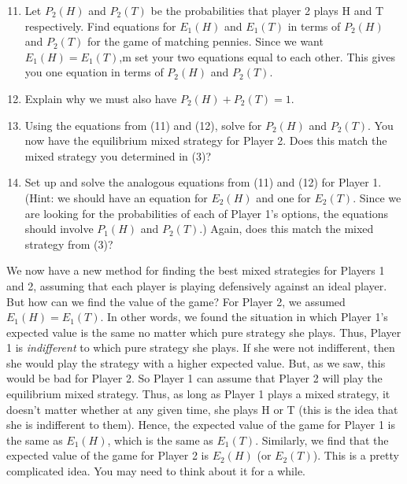 \begin{enumerate}
\setcounter{enumi}{10}

\item Let $P_2(H)$ and $P_2(T)$ be the probabilities that player 2 plays H and T respectively. Find equations for $E_1(H)$ and $E_1(T)$ in terms of $P_2(H)$ and $P_2(T)$ for the game of matching pennies. Since we want $E_1(H)=E_1(T)$,m set your two equations equal to each other. This gives you one equation in terms of $P_2(H)$ and $P_2(T)$.
\vspace{.1in}

\item Explain why we must also have $P_2(H)+P_2(T)=1$.
\vspace{.1 in} 

\item Using the equations from (11) and (12), solve for $P_2(H)$ and $P_2(T)$. You now have the equilibrium mixed strategy for Player 2. Does this match the mixed strategy you determined in (3)?
\vspace{.1 in}

\item Set up and solve the analogous equations from (11) and (12) for Player 1. (Hint: we should have an equation for $E_2(H)$ and one for $E_2(T)$. Since we are looking for the probabilities of each of Player 1's options, the equations should involve $P_1(H)$ and $P_2(T)$.) Again, does this match the mixed strategy from (3)? 
\vspace{.1 in}

\end{enumerate}

We now have a new method for finding the best mixed strategies for Players 1 and 2, assuming that each player is playing defensively against an ideal player. But how can we find the value of the game?  For Player 2, we assumed $E_1(H)=E_1(T)$. In other words, we found the situation in which Player 1's expected value is the same no matter which pure strategy she plays. Thus, Player 1 is {\it indifferent} to which pure strategy she plays. If she were not indifferent, then she would play the strategy with a higher expected value. But, as we saw, this would be bad for Player 2. So Player 1 can assume that Player 2 will play the equilibrium mixed strategy. Thus, as long as Player 1 plays a mixed strategy, it doesn't matter whether at any given time, she plays H or T (this is the idea that she is indifferent to them). Hence, the expected value of the game for Player 1 is the same as $E_1(H)$, which is the same as $E_1(T)$. Similarly, we find that the expected value of the game for Player 2 is $E_2(H)$ (or $E_2(T)$). This is a pretty complicated idea. You may need to think about it for a while.

